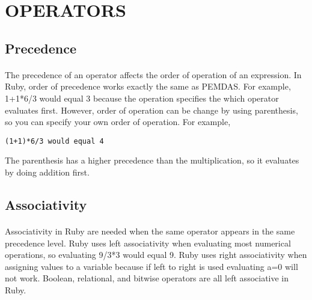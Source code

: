 \documentclass[11pt]{article}
\begin{document}
\section{OPERATORS}
\subsection{Precedence}
\paragraph{}
The precedence of an operator affects the order of operation of an expression. In Ruby, order of precedence works exactly the same as PEMDAS. For example, 1+1*6/3 would equal 3 because the operation specifies the which operator evaluates first. However, order of operation can be change by using parenthesis, so you can specify your own order of operation. For example,
 \begin{center}
 \texttt{(1+1)*6/3 would equal 4} 
\end{center}
 The parenthesis has a higher precedence than the multiplication, so it evaluates by doing addition first. 
\subsection{Associativity}
\paragraph{}
Associativity in Ruby are needed when the same operator appears in the same precedence level. Ruby uses left associativity when evaluating most numerical operations, so evaluating 9/3*3 would equal 9. \cite{jan} Ruby uses right associativity when assigning values to a variable because if left to right is used evaluating a=0 will not work. Boolean, relational, and bitwise operators are all left associative in Ruby. 


\newpage


\end{document}
